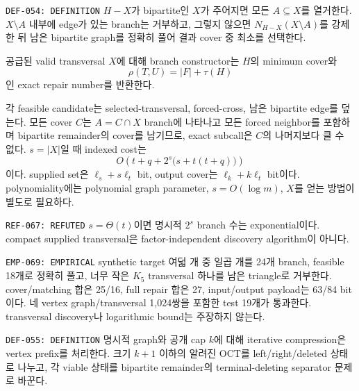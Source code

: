 \documentclass[11pt]{article}
\begin{document}
{\texttt{DEF-054: DEFINITION}}
\(H-X\)가 bipartite인 \(X\)가 주어지면 모든 \(A\subseteq X\)를
열거한다. \(X\setminus A\) 내부에 edge가 있는 branch는 거부하고,
그렇지 않으면 \(N_{H-X}(X\setminus A)\)를 강제한 뒤 남은 bipartite
graph를 정확히 풀어 결과 cover 중 최소를 선택한다.

{}
공급된 valid transversal \(X\)에 대해 branch constructor는 \(H\)의
minimum cover와
\[
 \rho(T,U)=|F|+\tau(H)
\]
인 exact repair number를 반환한다.
\begin{claimproof}
각 feasible candidate는 selected-transversal, forced-cross, 남은
bipartite edge를 덮는다. 모든 cover \(C\)는 \(A=C\cap X\) branch에
나타나고 모든 forced neighbor를 포함하며 bipartite remainder의
cover를 남기므로, exact subcall은 \(C\)의 나머지보다 클 수 없다.
\(s=|X|\)일 때 indexed cost는
\[
 O\!\left(t+q+2^s\bigl(s+t(t+q)\bigr)\right)
\]
이다. supplied set은 \(\ell_s+s\ell_t\) bit, output cover는
\(\ell_k+k\ell_t\) bit이다. polynomiality에는 polynomial graph
parameter, \(s=O(\log m)\), \(X\)를 얻는 방법이 별도로 필요하다.
\end{claimproof}

{\texttt{REF-067: REFUTED}}
\(s=\Theta(t)\)이면 명시적 \(2^s\) branch 수는 exponential이다.
compact supplied transversal은 factor-independent discovery algorithm이
아니다.

{\texttt{EMP-069: EMPIRICAL}}
synthetic target 여덟 개 중 일곱 개를 24개 branch, feasible 18개로
정확히 풀고, 너무 작은 \(K_5\) transversal 하나를 남은 triangle로
거부한다. cover/matching 합은 25/16, full repair 합은 27,
input/output payload는 63/84 bit이다. 네 vertex graph/transversal
1,024쌍을 포함한 test 19개가 통과한다. transversal discovery나
logarithmic bound는 주장하지 않는다.

{\texttt{DEF-055: DEFINITION}}
명시적 graph와 공개 cap \(k\)에 대해 iterative compression은 vertex
prefix를 처리한다. 크기 \(k+1\) 이하의 알려진 OCT를
left/right/deleted 상태로 나누고, 각 viable 상태를 bipartite
remainder의 terminal-deleting separator 문제로 바꾼다.
\end{document}
